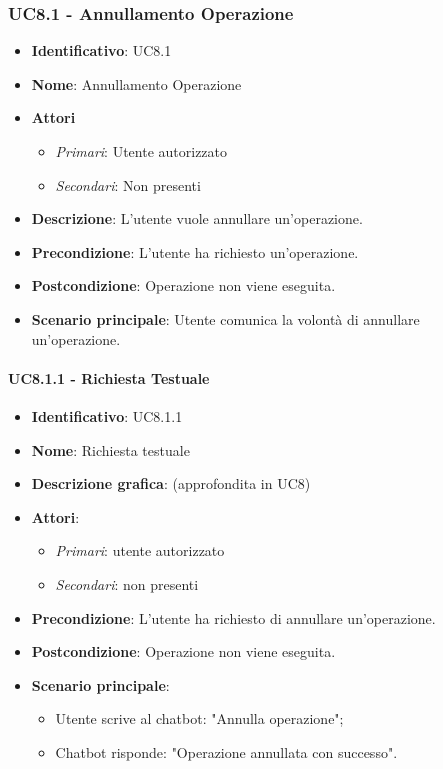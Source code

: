 \subsubsection{UC8.1 - Annullamento Operazione}
\begin{itemize}
  \item \textbf{Identificativo}: UC8.1
  \item \textbf{Nome}: Annullamento Operazione 
  \item \textbf{Attori}
  \begin{itemize} 
    \item \textit{Primari}: Utente autorizzato
    \item \textit{Secondari}: Non presenti
  \end{itemize}
  \item \textbf{Descrizione}: L'utente vuole annullare un'operazione.
  \item \textbf{Precondizione}: L'utente ha richiesto un'operazione.
  \item \textbf{Postcondizione}: Operazione non viene eseguita.
  \item \textbf{Scenario principale}: Utente comunica la volontà di annullare un'operazione.
\end{itemize}

\paragraph{UC8.1.1 - Richiesta Testuale}
\begin{itemize}
   \item \textbf{Identificativo}: UC8.1.1
   \item \textbf{Nome}: Richiesta testuale
   \item \textbf{Descrizione grafica}: (approfondita in UC8)
   \item \textbf{Attori}:
   \begin{itemize} 
       \item \textit{Primari}: utente autorizzato
       \item \textit{Secondari}: non presenti
   \end{itemize}
       \item \textbf{Precondizione}: L'utente ha richiesto di annullare un'operazione.
       \item \textbf{Postcondizione}: Operazione non viene eseguita. 
    \item \textbf{Scenario principale}: 
       \begin{itemize}
        \item Utente scrive al chatbot: "Annulla operazione";
        \item Chatbot risponde: "Operazione annullata con successo".
       \end{itemize}
\end{itemize}

